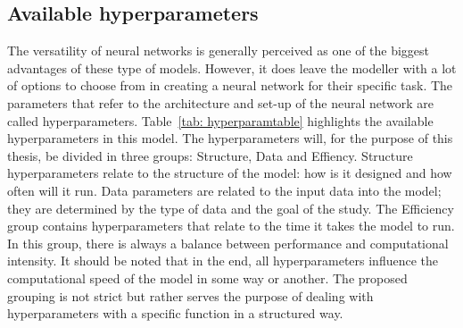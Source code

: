 \documentclass[twocolumn, 10pt, a4paper]{memoir}
\begin{document}
	\subsection{Available hyperparameters} \label{sec: Avail hyper}
	The versatility of neural networks is generally perceived as one of the biggest advantages of these type of models. However, it does leave the modeller with a lot of options to choose from in creating a neural network for their specific task. The parameters that refer to the architecture and set-up of the neural network are called hyperparameters. Table~\ref{tab: hyperparamtable} highlights the available hyperparameters in this model. The hyperparameters will, for the purpose of this thesis, be divided in three groups: Structure, Data and Effiency. Structure hyperparameters relate to the structure of the model: how is it designed and how often will it run. Data parameters are related to the input data into the model; they are determined by the type of data and the goal of the study. The Efficiency group contains hyperparameters that relate to the time it takes the model to run. In this group, there is always a balance between performance and computational intensity. It should be noted that in the end, all hyperparameters influence the computational speed of the model in some way or another. The proposed grouping is not strict but rather serves the purpose of dealing with hyperparameters with a specific function in a structured way.
	
\end{document}
